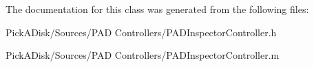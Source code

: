 The documentation for this class was generated from the following files:\begin{DoxyCompactItemize}
\item 
PickADisk/Sources/PAD Controllers/PADInspectorController.h\item 
PickADisk/Sources/PAD Controllers/PADInspectorController.m\end{DoxyCompactItemize}
